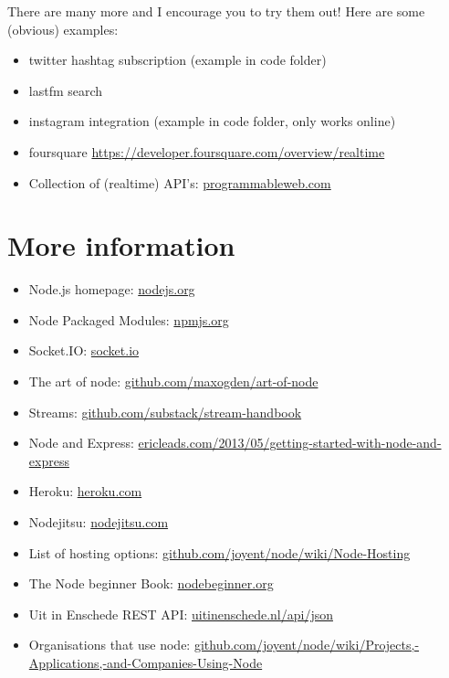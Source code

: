 \documentclass[a4paper]{report}
\begin{document}
There are many more and I encourage you to try them out! Here are some (obvious) examples:

\begin{itemize}
	\item twitter hashtag subscription (example in code folder)
	\item lastfm search
	\item instagram integration (example in code folder, only works online)
	\item foursquare \href{https://developer.foursquare.com/overview/realtime}{https://developer.foursquare.com/overview/realtime}
	\item Collection of (realtime) API's: \href{http://www.programmableweb.com/}{programmableweb.com}
\end{itemize}

\section*{More information}
\begin{itemize}
	\item Node.js homepage: \href{http://nodejs.org}{nodejs.org}
	\item Node Packaged Modules: \href{https://npmjs.org/}{npmjs.org}
	\item Socket.IO: \href{http://socket.io/}{socket.io}
	\item The art of node: \href{https://github.com/maxogden/art-of-node}{github.com/maxogden/art-of-node}
	\item Streams: \href{https://github.com/substack/stream-handbook}{github.com/substack/stream-handbook}
	\item Node and Express: \href{http://ericleads.com/2013/05/getting-started-with-node-and-express/}{ericleads.com/2013/05/getting-started-with-node-and-express}
	\item Heroku: \href{https://www.heroku.com/}{heroku.com}
	\item Nodejitsu: \href{https://www.nodejitsu.com/}{nodejitsu.com}
	\item List of hosting options: \href{https://github.com/joyent/node/wiki/Node-Hosting}{github.com/joyent/node/wiki/Node-Hosting}
	\item The Node beginner Book: \href{http://www.nodebeginner.org/}{nodebeginner.org}
	\item Uit in Enschede REST API: \href{http://www.uitinenschede.nl/api/json/?page=index}{uitinenschede.nl/api/json}
	\item Organisations that use node: \href{https://github.com/joyent/node/wiki/Projects,-Applications,-and-Companies-Using-Node}{github.com/joyent/node/wiki/Projects,-Applications,-and-Companies-Using-Node}
\end{itemize}

\end{document}
